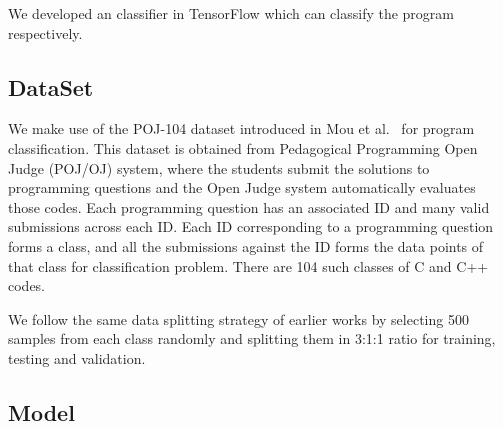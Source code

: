 
We developed an classifier in TensorFlow\cite{tensorflow2015-whitepaper} which can classify the program respectively. 
\subsection{DataSet}

We make use of the POJ-104 dataset introduced in Mou et al.~\cite{tbcnn-aaai16} for program classification. This dataset is obtained from Pedagogical Programming Open Judge (POJ/OJ) system, where the students submit the solutions to programming questions and the Open Judge system automatically evaluates those codes. 
Each programming question has an associated ID and many valid submissions across each ID. 
Each ID corresponding to a programming question forms a class, and all the submissions against the ID forms the data points of that class for classification problem. There are 104 such classes of C and C++ codes.

We follow the same data splitting strategy of earlier works by selecting 500 samples from each class randomly and splitting them in 3:1:1 ratio for training, testing and validation.


\subsection{Model}


